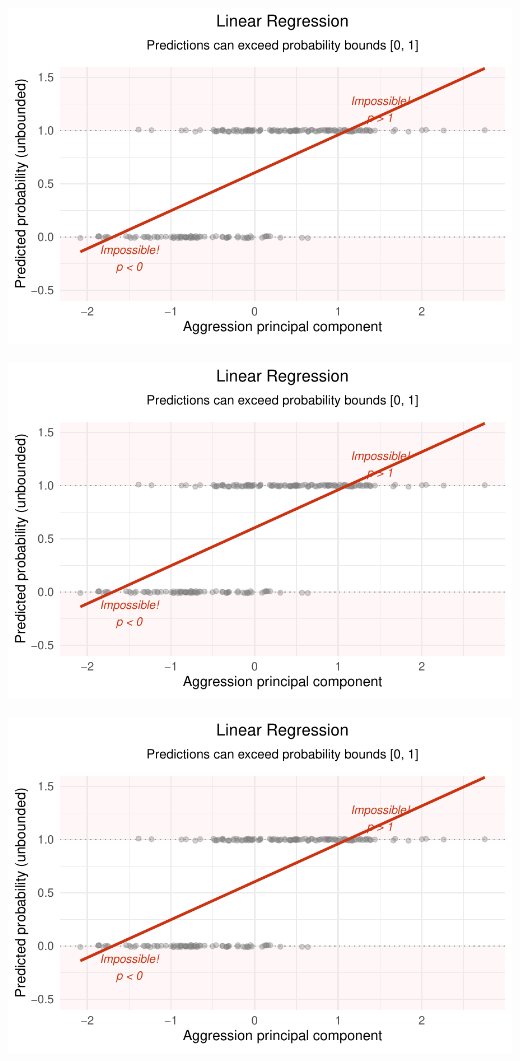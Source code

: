 \documentclass[
  letterpaper,
  DIV=11,
  numbers=noendperiod]{scrartcl}
\begin{document}
\begin{center}
\includegraphics[width=0.8\linewidth,height=\textheight,keepaspectratio]{Beyond!!!_files/figure-pdf/unnamed-chunk-4-21.pdf}
\end{center}

\begin{center}
\includegraphics[width=0.8\linewidth,height=\textheight,keepaspectratio]{Beyond!!!_files/figure-pdf/unnamed-chunk-4-22.pdf}
\end{center}

\begin{center}
\includegraphics[width=0.8\linewidth,height=\textheight,keepaspectratio]{Beyond!!!_files/figure-pdf/unnamed-chunk-4-23.pdf}
\end{center}
\end{document}
